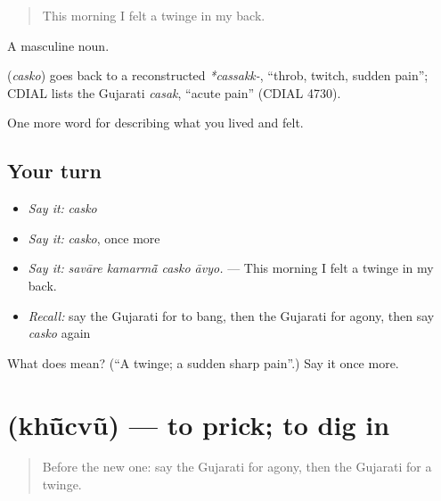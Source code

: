 \begin{quote}
This morning I felt a twinge in my back.
\end{quote}

A masculine noun.

\begin{cousinweb}
\textbf{} (\emph{casko}) goes back to a reconstructed \emph{*cassakk-}, \textquotedblleft{}throb, twitch, sudden pain\textquotedblright{}; CDIAL lists the Gujarati \emph{casak}, \textquotedblleft{}acute pain\textquotedblright{} (CDIAL 4730).
\end{cousinweb}

\begin{grammarlens}[title={What you've built}]
One more word for describing what you lived and felt.
\end{grammarlens}

\subsection*{Your turn}
\begin{itemize}
\raggedright
  \item \emph{Say it:} \emph{casko}
  \item \emph{Say it:} \emph{casko}, once more
  \item \emph{Say it:} \emph{savāre kamarmā̃ casko āvyo.} — This morning I felt a twinge in my back.
  \item \emph{Recall:} say the Gujarati for to bang, then the Gujarati for agony, then say \emph{casko} again
\end{itemize}

\begin{tcolorbox}[breakable,colback=teal!4,colframe=teal!35!black,title={Before you move on}]
What does  mean? (\textquotedblleft{}A twinge; a sudden sharp pain\textquotedblright{}.) Say it once more.
\end{tcolorbox}
\section[\texorpdfstring{\gu{ખૂંચવું} (khū̃cvũ)}{ખૂંચવું (khū̃cvũ)}]{ (khū̃cvũ) — to prick; to dig in}

\label{lesson:GU-C483-khucvu}



\begin{quote}
Before the new one: say the Gujarati for agony, then the Gujarati for a twinge.
\end{quote}

